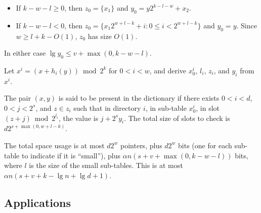 \documentclass[11pt,letterpaper]{article}
\begin{document}
\begin{itemize}
\item If $k - w - l \geq 0$, then $z_0 = \{x_1\}$ and $y_0 = y 2^{k - l - w} + x_2$.
\item If $k - w - l < 0$, then $z_0 = \{x_1 2^{w + l - k} + i : 0 \leq i < 2^{w + l - k}\}$ and $y_0 = y$.
  Since $w \geq l + k - O(1)$, $z_0$ has size $O(1)$.
\end{itemize}

In either case $\lg y_0 \leq v + \max(0, k - w - l)$.




Let $x^i = (x + h_i(y)) \bmod 2^k$ for $0 < i < w$, and derive $x^i_0$, $l_i$, $z_i$, and $y_i$ from $x^i$.

The pair $(x,y)$ is said to be present in the dictionary if there exists $0 < i < d$, $0 < j < 2^s$, and $z \in z_i$ such that in directory $i$, in sub-table $x^i_0$, in slot $(z + j) \bmod 2^{l_i}$, the value is $j + 2^s y_i$.
The total size of slots to check is $d 2^{s + \max(0, w + l - k)}$.

The total space usage is at most $d 2^w$ pointers, plus $d 2^w$ bits (one for each sub-table to indicate if it is ``small''), plus $\alpha n (s + v + \max(0, k - w - l))$ bits, where $l$ is the size of the small sub-tables.
This is at most $\alpha n (s + v + k - \lg n + \lg d + 1)$.





\subsection{Applications}
\end{document}
